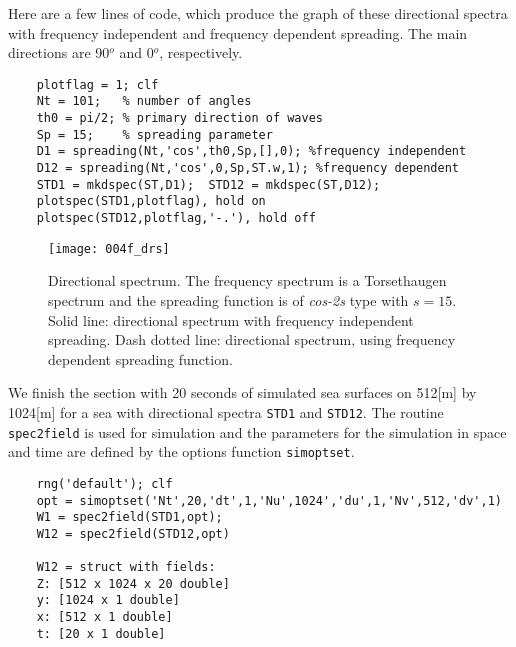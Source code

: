 Here are a few lines of code, which produce the graph of these
directional spectra with frequency independent and frequency dependent
spreading. The main directions are 90$^o$ and 0$^o$, respectively.
{\small\begin{verbatim}
    plotflag = 1; clf
    Nt = 101;   % number of angles
    th0 = pi/2; % primary direction of waves
    Sp = 15;    % spreading parameter
    D1 = spreading(Nt,'cos',th0,Sp,[],0); %frequency independent
    D12 = spreading(Nt,'cos',0,Sp,ST.w,1); %frequency dependent
    STD1 = mkdspec(ST,D1);  STD12 = mkdspec(ST,D12);
    plotspec(STD1,plotflag), hold on
    plotspec(STD12,plotflag,'-.'), hold off
\end{verbatim}}

\begin{figure}[tbh]
  \centering
  \texttt{[image: 004f\_drs]}
\vspace{-3mm}
  \caption[Example of directional spectrum]{Directional spectrum.
  The frequency spectrum is a
  Torsethaugen spectrum and the spreading function is of \emph{cos-2s}
  type with $s = 15$. Solid line: directional spectrum with frequency
  independent spreading. Dash dotted line:
  directional spectrum, using frequency dependent spreading function.}
  \label{fig:directspect}
  \end{figure}

We finish the section with 20 seconds of simulated sea surfaces on 512[m] by 1024[m]
for a sea with directional spectra {\tt STD1} and {\tt STD12}. The
routine \verb+spec2field+ is used for simulation and the parameters 
for the simulation in space and time  
are defined by the options function \verb+simoptset+. 
{\small\begin{verbatim}
    rng('default'); clf
    opt = simoptset('Nt',20,'dt',1,'Nu',1024','du',1,'Nv',512,'dv',1)
    W1 = spec2field(STD1,opt);
    W12 = spec2field(STD12,opt)
    
    W12 = struct with fields:
    Z: [512 x 1024 x 20 double]
    y: [1024 x 1 double]
    x: [512 x 1 double]
    t: [20 x 1 double]
\end{verbatim}}
\noindent
{}

